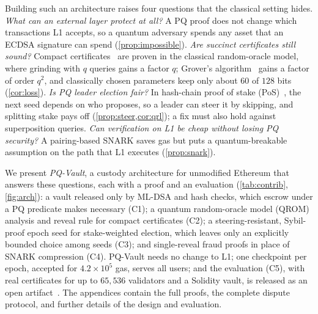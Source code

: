 \documentclass[10pt,journal,compsoc]{IEEEtran}
\theoremstyle{tplain}
\theoremstyle{tdef}
\theoremstyle{remark}
\begin{document}
Building such an architecture raises four questions that the classical setting hides. \emph{What can an external layer protect at all?} A PQ proof does not change which transactions L1 accepts, so a quantum adversary spends any asset that an ECDSA signature can spend (\cref{prop:impossible}). \emph{Are succinct certificates still sound?} Compact certificates~\cite{micali2020compact} are proven in the classical random-oracle model, where grinding with $q$ queries gains a factor $q$; Grover's algorithm~\cite{grover1996} gains a factor of order $q^2$, and classically chosen parameters keep only about $60$ of $128$ bits (\cref{cor:loss}). \emph{Is PQ leader election fair?} In hash-chain proof of stake (PoS)~\cite{QRL}, the next seed depends on who proposes, so a leader can steer it by skipping, and splitting stake pays off (\cref{prop:steer,cor:qrl}); a fix must also hold against superposition queries. \emph{Can verification on L1 be cheap without losing PQ security?} A pairing-based SNARK saves gas but puts a quantum-breakable assumption on the path that L1 executes (\cref{prop:snark}).

We present \emph{PQ-Vault}, a custody architecture for unmodified Ethereum that answers these questions, each with a proof and an evaluation (\cref{tab:contrib}, \cref{fig:arch}): a vault released only by ML-DSA and hash checks, which escrow under a PQ predicate makes necessary (C1); a quantum random-oracle model (QROM) analysis and reveal rule for compact certificates (C2); a steering-resistant, Sybil-proof epoch seed for stake-weighted election, which leaves only an explicitly bounded choice among seeds (C3); and single-reveal fraud proofs in place of SNARK compression (C4). PQ-Vault needs no change to L1; one checkpoint per epoch, accepted for $4.2\times10^5$ gas, serves all users; and the evaluation (C5), with real certificates for up to $65{,}536$ validators and a Solidity vault, is released as an open artifact~\cite{pqvault_artifact}. The appendices contain the full proofs, the complete dispute protocol, and further details of the design and evaluation.
\end{document}
